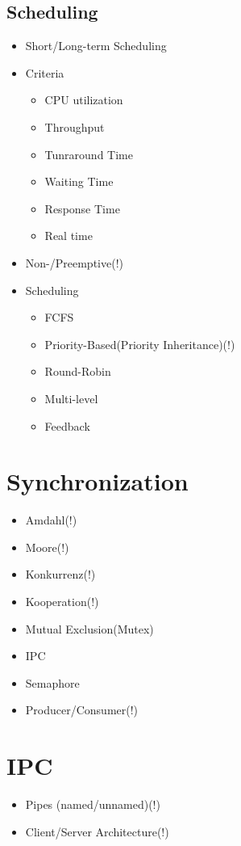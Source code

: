 \documentclass[10pt,a4paper]{article}
\begin{document}
		\subsection{Scheduling}
			\begin{itemize}
				\item Short/Long-term Scheduling
				\item Criteria
				\begin{itemize}
					\item CPU utilization
					\item Throughput
					\item Tunraround Time
					\item Waiting Time 
					\item Response Time
					\item Real time 
				\end{itemize}
				\item Non-/Preemptive(!)
				\item Scheduling
				\begin{itemize}
					\item FCFS
					\item Priority-Based(Priority Inheritance)(!)
					\item Round-Robin
					\item Multi-level
					\item Feedback
				\end{itemize}
			\end{itemize}
	\section{Synchronization}
		\begin{itemize}
			\item Amdahl(!)
			\item Moore(!)
			\item Konkurrenz(!)
			\item Kooperation(!)
			\item Mutual Exclusion(Mutex)
			\item IPC
			\item Semaphore
			\item Producer/Consumer(!)
		\end{itemize}
	\section{IPC}
		\begin{itemize}
			\item Pipes (named/unnamed)(!)
			\item Client/Server Architecture(!)
		\end{itemize}
\end{document}
